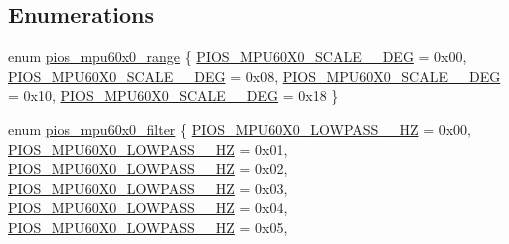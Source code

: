 \subsection*{\-Enumerations}
\begin{DoxyCompactItemize}
\item 
enum \hyperlink{group___p_i_o_s___m_p_u60_x0_ga56700b0154a14cf67c9f8f44a86ad9c0}{pios\-\_\-mpu60x0\-\_\-range} \{ \hyperlink{group___p_i_o_s___m_p_u60_x0_gga56700b0154a14cf67c9f8f44a86ad9c0a844b5fe3b7c4340fd6b1f787e3562074}{\-P\-I\-O\-S\-\_\-\-M\-P\-U60\-X0\-\_\-\-S\-C\-A\-L\-E\-\_\-\_\-\-D\-E\-G} =  0x00, 
\hyperlink{group___p_i_o_s___m_p_u60_x0_gga56700b0154a14cf67c9f8f44a86ad9c0aab19279d4ea821210807574a79ea9848}{\-P\-I\-O\-S\-\_\-\-M\-P\-U60\-X0\-\_\-\-S\-C\-A\-L\-E\-\_\-\_\-\-D\-E\-G} =  0x08, 
\hyperlink{group___p_i_o_s___m_p_u60_x0_gga56700b0154a14cf67c9f8f44a86ad9c0a458ad026c28a005119fa0be6b3cb598b}{\-P\-I\-O\-S\-\_\-\-M\-P\-U60\-X0\-\_\-\-S\-C\-A\-L\-E\-\_\-\_\-\-D\-E\-G} =  0x10, 
\hyperlink{group___p_i_o_s___m_p_u60_x0_gga56700b0154a14cf67c9f8f44a86ad9c0aee36f45d405393cfda0e34ae3343e82d}{\-P\-I\-O\-S\-\_\-\-M\-P\-U60\-X0\-\_\-\-S\-C\-A\-L\-E\-\_\-\_\-\-D\-E\-G} =  0x18
 \}
\item 
enum \hyperlink{group___p_i_o_s___m_p_u60_x0_gacce1988bc994f5ade6ac748c2bf0b924}{pios\-\_\-mpu60x0\-\_\-filter} \{ \*
\hyperlink{group___p_i_o_s___m_p_u60_x0_ggacce1988bc994f5ade6ac748c2bf0b924ae157a08db065baba4dccbcde493815ab}{\-P\-I\-O\-S\-\_\-\-M\-P\-U60\-X0\-\_\-\-L\-O\-W\-P\-A\-S\-S\-\_\-\_\-\-H\-Z} =  0x00, 
\hyperlink{group___p_i_o_s___m_p_u60_x0_ggacce1988bc994f5ade6ac748c2bf0b924a81f76791864eef8d46b7ed7275f44e43}{\-P\-I\-O\-S\-\_\-\-M\-P\-U60\-X0\-\_\-\-L\-O\-W\-P\-A\-S\-S\-\_\-\_\-\-H\-Z} =  0x01, 
\hyperlink{group___p_i_o_s___m_p_u60_x0_ggacce1988bc994f5ade6ac748c2bf0b924af6aeb4aea577abd59ca43fad9b3a3ec7}{\-P\-I\-O\-S\-\_\-\-M\-P\-U60\-X0\-\_\-\-L\-O\-W\-P\-A\-S\-S\-\_\-\_\-\-H\-Z} =  0x02, 
\hyperlink{group___p_i_o_s___m_p_u60_x0_ggacce1988bc994f5ade6ac748c2bf0b924a67da1f1072d9faf4131fa9a75199fc9a}{\-P\-I\-O\-S\-\_\-\-M\-P\-U60\-X0\-\_\-\-L\-O\-W\-P\-A\-S\-S\-\_\-\_\-\-H\-Z} =  0x03, 
\*
\hyperlink{group___p_i_o_s___m_p_u60_x0_ggacce1988bc994f5ade6ac748c2bf0b924a062161a90f5707cb119593aea0f93b70}{\-P\-I\-O\-S\-\_\-\-M\-P\-U60\-X0\-\_\-\-L\-O\-W\-P\-A\-S\-S\-\_\-\_\-\-H\-Z} =  0x04, 
\hyperlink{group___p_i_o_s___m_p_u60_x0_ggacce1988bc994f5ade6ac748c2bf0b924a2723be4d8be35f6f275d9fdf0f395e01}{\-P\-I\-O\-S\-\_\-\-M\-P\-U60\-X0\-\_\-\-L\-O\-W\-P\-A\-S\-S\-\_\-\_\-\-H\-Z} =  0x05, 

\end{DoxyCompactItemize}
